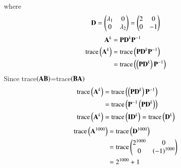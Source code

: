\documentclass[journal]{IEEEtran}
\begin{document}
 where 
 \begin{align}
\mathbf{D}=\begin{pmatrix}\lambda_1&0\\0&\lambda_2\end{pmatrix}=\begin{pmatrix}2&0\\0&-1\end{pmatrix}\\
 \end{align}
 \begin{align}
     \mathbf{A}^k&=\mathbf{P}\mathbf{D}^k\mathbf{P}^{-1}\\
\text{trace}\left(\mathbf{A}^k\right)&=\text{trace}\left(\mathbf{P}\mathbf{D}^k\mathbf{P}^{-1}\right) \\
&=\text{trace}\left(\left(\mathbf{P}\mathbf{D}^k\right)\mathbf{P}^{-1}\right) 
     \end{align}
     Since trace$\left(\mathbf{AB}\right)$=trace$\left(\mathbf{BA}\right)$
     \begin{align}
\text{trace}\left(\mathbf{A}^k\right)&=\text{trace}\left(\left(\mathbf{P}\mathbf{D}^k\right)\mathbf{P}^{-1}\right)  \\
&=\text{trace}\left(\mathbf{P}^{-1}\left(\mathbf{P}\mathbf{D}^k\right)\right)  \\
\text{trace}\left(\mathbf{A}^k\right)&=\text{trace}\left(\mathbf{I}\mathbf{D}^k\right)=\text{trace}\left(\mathbf{D}^k\right)
     \end{align}
     \begin{align}
     \text{trace}\left(\mathbf{A}^{1000}\right)&=\text{trace}\left(\mathbf{D}^{1000}\right) \\
&=\text{trace}\begin{pmatrix}2^{1000}&0\\0&\left(-1\right)^{1000}\end{pmatrix} \\
&=2^{1000}+1
 \end{align}
 
\end{document}
